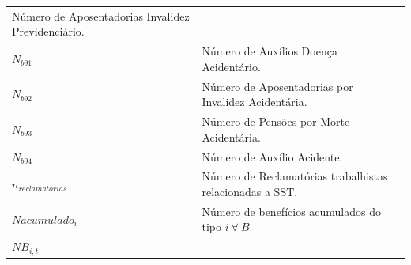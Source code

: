 \documentclass[]{article}
\begin{document}
\begin{longtable}[]{@{}ll@{}}
\begin{minipage}[t]{0.87\columnwidth}
Número de Aposentadorias Invalidez Previdenciário.\strut
\end{minipage}\tabularnewline
\begin{minipage}[t]{0.07\columnwidth}\raggedright\strut
\(N_{b91}\)\strut
\end{minipage} & \begin{minipage}[t]{0.87\columnwidth}\raggedright\strut
Número de Auxílios Doença Acidentário.\strut
\end{minipage}\tabularnewline
\begin{minipage}[t]{0.07\columnwidth}\raggedright\strut
\(N_{b92}\)\strut
\end{minipage} & \begin{minipage}[t]{0.87\columnwidth}\raggedright\strut
Número de Aposentadorias por Invalidez Acidentária.\strut
\end{minipage}\tabularnewline
\begin{minipage}[t]{0.07\columnwidth}\raggedright\strut
\(N_{b93}\)\strut
\end{minipage} & \begin{minipage}[t]{0.87\columnwidth}\raggedright\strut
Número de Pensões por Morte Acidentária.\strut
\end{minipage}\tabularnewline
\begin{minipage}[t]{0.07\columnwidth}\raggedright\strut
\(N_{b94}\)\strut
\end{minipage} & \begin{minipage}[t]{0.87\columnwidth}\raggedright\strut
Número de Auxílio Acidente.\strut
\end{minipage}\tabularnewline
\begin{minipage}[t]{0.07\columnwidth}\raggedright\strut
\(n_{reclamatorias}\)\strut
\end{minipage} & \begin{minipage}[t]{0.87\columnwidth}\raggedright\strut
Número de Reclamatórias trabalhistas relacionadas a SST.\strut
\end{minipage}\tabularnewline
\begin{minipage}[t]{0.07\columnwidth}\raggedright\strut
\(Nacumulado_{i}\)\strut
\end{minipage} & \begin{minipage}[t]{0.87\columnwidth}\raggedright\strut
Número de benefícios acumulados do tipo \(i\ \forall\ B\)\strut
\end{minipage}\tabularnewline
\begin{minipage}[t]{0.07\columnwidth}\raggedright\strut
\(NB_{i,t}\)\strut
\end{minipage} & \begin{minipage}[t]{0.87\columnwidth}\raggedright\strut

\end{minipage}
\end{longtable}
\end{document}
